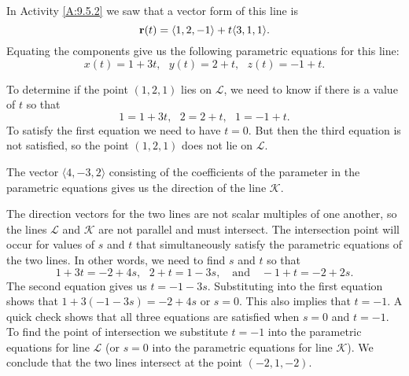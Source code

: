 \begin{activitySolution}
	\ba
	\item In Activity \ref{A:9.5.2} we saw that a vector form of this line is 
\[\mathbf{r}(t) = \langle 1,2,-1\rangle + t\langle 3, 1, 1 \rangle.\]
Equating the components give us the following parametric equations for this line: 
\[x(t) = 1 + 3t, \ \ \ y(t) = 2+t, \ \ \ z(t) = -1 + t.\]
	\item To determine if the point $(1, 2, 1)$ lies on $\mathcal{L}$, we need to know if there is a value of $t$ so that 
\[1 = 1 + 3t, \ \ \ 2 = 2+t, \ \ \ 1 = -1 + t.\]
To satisfy the first equation we need to have $t=0$. But then the third equation is not satisfied, so the point  $(1, 2, 1)$ does not lie on $\mathcal{L}$. 
	\item The vector $\langle 4, -3, 2 \rangle$ consisting of the coefficients of the parameter in the parametric equations gives us the direction of the line $\mathcal{K}$.
	\item The direction vectors for the two lines are not scalar multiples of one another, so the lines $\mathcal{L}$ and $\mathcal{K}$ are not parallel and must intersect. The intersection point will occur for values of $s$ and $t$ that simultaneously satisfy the parametric equations of the two lines. In other words, we need to find $s$ and $t$ so that 
\[1+3t = -2+4s, \ \ \ 2+t = 1-3s, \ \ \ \text{ and } \ \ \  -1+t = -2+2s.\]
The second equation gives us $t = -1-3s$. Substituting into the first equation shows that $1+3(-1-3s) = -2+4s$ or $s = 0$. This also implies that $t=-1$. A quick check shows that all three equations are satisfied when $s=0$ and $t=-1$. To find the point of intersection we substitute $t=-1$ into the parametric equations for line $\mathcal{L}$ (or $s=0$ into the parametric equations for line $\mathcal{K}$). We conclude that the two lines intersect at the point $(-2,1,-2)$.  
	\ea

\end{activitySolution}
\aftera
